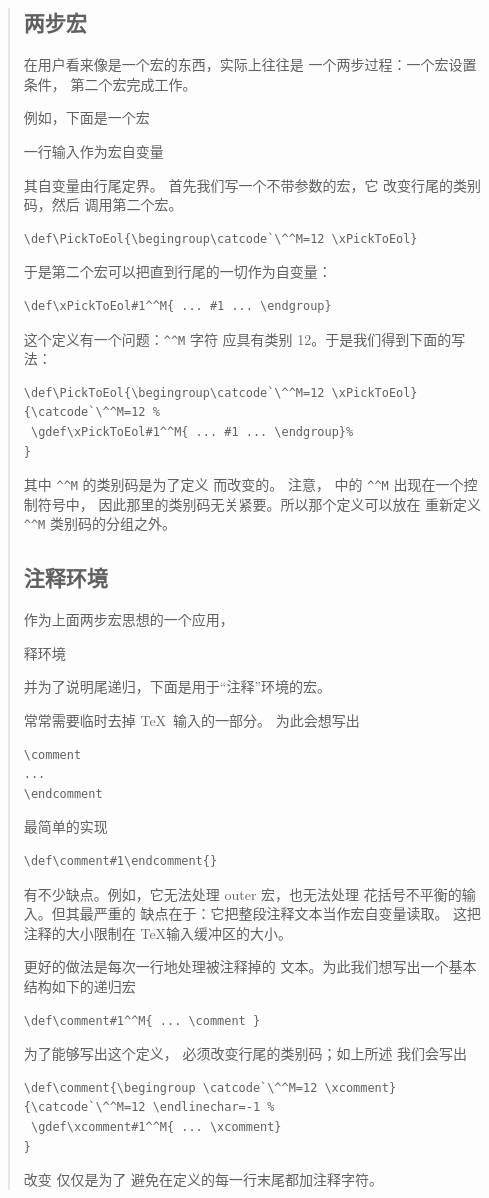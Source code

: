 \documentclass[a4paper]{rapport3}
\newenvironment{disp}{\begin{quotation}}{\end{quotation}}
\def\howto#1\par{}
\begin{document}
\begin{disp}
\subsection{两步宏}

在用户看来像是一个宏的东西，实际上往往是
一个两步过程：一个宏设置条件，
第二个宏完成工作。

例如，下面是一个宏 \label{pick:eol}
\howto 把一行输入作为宏自变量\par
其自变量由行尾定界。
首先我们写一个不带参数的宏，它
改变行尾的类别码，然后
调用第二个宏。
\begin{verbatim}
\def\PickToEol{\begingroup\catcode`\^^M=12 \xPickToEol}
\end{verbatim}
于是第二个宏可以把直到行尾的一切作为自变量：
\begin{verbatim}
\def\xPickToEol#1^^M{ ... #1 ... \endgroup}
\end{verbatim}
这个定义有一个问题：\verb>^^M> 字符
应具有类别 12。于是我们得到下面的写法：
\begin{verbatim}
\def\PickToEol{\begingroup\catcode`\^^M=12 \xPickToEol}
{\catcode`\^^M=12 %
 \gdef\xPickToEol#1^^M{ ... #1 ... \endgroup}%
}
\end{verbatim}
其中 \verb>^^M> 的类别码是为了定义  而改变的。
注意， 中的 \verb>^^M> 出现在一个控制符号中，
因此那里的类别码无关紧要。所以那个定义可以放在
重新定义 \verb>^^M> 类别码的分组之外。


\subsection{注释环境}

作为上面两步宏思想的一个应用，
\howto 注释环境\par
并为了说明尾递归，下面是用于“注释”环境的宏。

常常需要临时去掉 \TeX\ 输入的一部分。
为此会想写出 \begin{verbatim}
\comment
...
\endcomment
\end{verbatim}
最简单的实现 
\begin{verbatim}
\def\comment#1\endcomment{}
\end{verbatim} 
有不少缺点。例如，它无法处理 outer 宏，也无法处理
花括号不平衡的输入。但其最严重的
缺点在于：它把整段注释文本当作宏自变量读取。
这把注释的大小限制在 \TeX 输入缓冲区的大小。

更好的做法是每次一行地处理被注释掉的
文本。为此我们想写出一个基本结构如下的递归宏
\begin{verbatim}
\def\comment#1^^M{ ... \comment }
\end{verbatim}
为了能够写出这个定义，
必须改变行尾的类别码；如上所述
\altt
我们会写出
\begin{verbatim}
\def\comment{\begingroup \catcode`\^^M=12 \xcomment}
{\catcode`\^^M=12 \endlinechar=-1 %
 \gdef\xcomment#1^^M{ ... \xcomment}
}
\end{verbatim}
改变  仅仅是为了
避免在定义的每一行末尾都加注释字符。


\end{disp}
\end{document}
